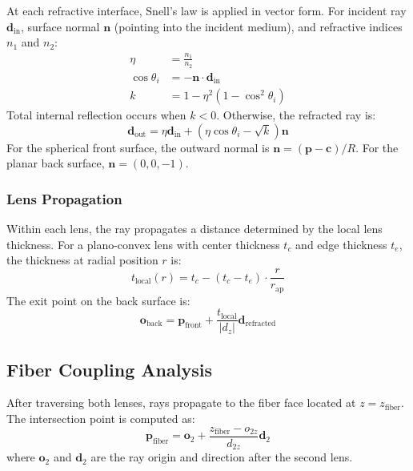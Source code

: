 At each refractive interface, Snell's law is applied in vector form. For incident ray $\mathbf{d}_{\text{in}}$, surface normal $\mathbf{n}$ (pointing into the incident medium), and refractive indices $n_1$ and $n_2$:
\begin{align}
\eta &= \frac{n_1}{n_2} \\
\cos\theta_i &= -\mathbf{n} \cdot \mathbf{d}_{\text{in}} \\
k &= 1 - \eta^2(1 - \cos^2\theta_i)
\end{align}
Total internal reflection occurs when $k < 0$. Otherwise, the refracted ray is:
\begin{equation}
\mathbf{d}_{\text{out}} = \eta \mathbf{d}_{\text{in}} + (\eta \cos\theta_i - \sqrt{k})\mathbf{n}
\end{equation}
For the spherical front surface, the outward normal is $\mathbf{n} = (\mathbf{p} - \mathbf{c})/R$. For the planar back surface, $\mathbf{n} = (0, 0, -1)$.

\subsubsection{Lens Propagation}

Within each lens, the ray propagates a distance determined by the local lens thickness. For a plano-convex lens with center thickness $t_c$ and edge thickness $t_e$, the thickness at radial position $r$ is:
\begin{equation}
t_{\text{local}}(r) = t_c - (t_c - t_e) \cdot \frac{r}{r_{\text{ap}}}
\end{equation}
The exit point on the back surface is:
\begin{equation}
\mathbf{o}_{\text{back}} = \mathbf{p}_{\text{front}} + \frac{t_{\text{local}}}{|d_z|} \mathbf{d}_{\text{refracted}}
\end{equation}

\subsection{Fiber Coupling Analysis}

After traversing both lenses, rays propagate to the fiber face located at $z = z_{\text{fiber}}$. The intersection point is computed as:
\begin{equation}
\mathbf{p}_{\text{fiber}} = \mathbf{o}_2 + \frac{z_{\text{fiber}} - o_{2z}}{d_{2z}} \mathbf{d}_2
\end{equation}
where $\mathbf{o}_2$ and $\mathbf{d}_2$ are the ray origin and direction after the second lens.

